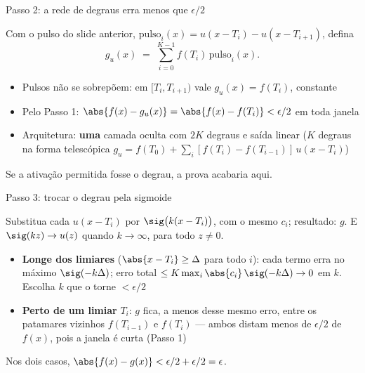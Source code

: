 \documentclass[aspectratio=169, 11pt]{beamer}
\begin{document}
\begin{frame}{Passo 2: a rede de degraus erra menos que $\epsilon/2$}

  Com o pulso do slide anterior,
  $\text{pulso}_i(x) = u(x - T_i) - u(x - T_{i+1})$, defina
  \[
    g_u(x) \;=\; \sum_{i=0}^{K-1} f(T_i)\, \text{pulso}_i(x).
  \]

  \begin{itemize}\setlength{\itemsep}{0.3ex}
    \item Pulsos não se sobrepõem: em $[T_i, T_{i+1})$ vale
          $g_u(x) = f(T_i)$, constante
    \item Pelo Passo 1: $\abs{f(x) - g_u(x)} = \abs{f(x) - f(T_i)} <
          \epsilon/2$ em toda janela
    \item Arquitetura: \textbf{uma} camada oculta com $2K$ degraus e saída
          linear ($K$ degraus na forma telescópica
          $g_u = f(T_0) + \sum_i [f(T_i) - f(T_{i-1})]\, u(x - T_i)$)
  \end{itemize}

  \smallskip

  \smallskip
  {\small Se a ativação permitida fosse o degrau, a prova acabaria aqui.}
\end{frame}

\begin{frame}{Passo 3: trocar o degrau pela sigmoide}

  Substitua cada $u(x - T_i)$ por $\sig\big(k(x - T_i)\big)$, com o mesmo
  $c_i$; resultado: $g$. E $\sig(k z) \to u(z)$ quando $k \to \infty$,
  para todo $z \ne 0$.

  \smallskip
  \begin{itemize}\setlength{\itemsep}{0.3ex}
    \item \textbf{Longe dos limiares} ($\abs{x - T_i} \ge \Delta$ para todo
          $i$): cada termo erra no máximo $\sig(-k\Delta)$; erro total
          $\le K \max_i \abs{c_i}\, \sig(-k\Delta) \to 0$ em $k$. Escolha
          $k$ que o torne $< \epsilon/2$
    \item \textbf{Perto de um limiar} $T_i$: $g$ fica, a menos desse mesmo
          erro, entre os patamares vizinhos $f(T_{i-1})$ e $f(T_i)$ — ambos
          distam menos de $\epsilon/2$ de $f(x)$, pois a janela é curta
          (Passo 1)
  \end{itemize}

  \smallskip
  Nos dois casos, $\abs{f(x) - g(x)} < \epsilon/2 + \epsilon/2 = \epsilon$.

  \smallskip
\end{frame}
\end{document}
